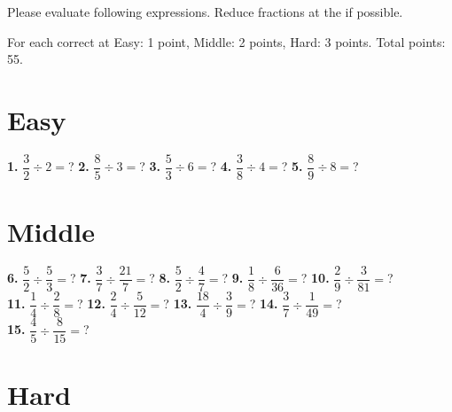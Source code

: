 \documentclass[a4paper]{article}
\begin{document}
\begin{Large}

Please evaluate following expressions. Reduce fractions at the if possible.

For each correct at Easy: 1 point, Middle: 2 points, Hard: 3 points. Total points: 55.

\section* {Easy}
		
\textbf{1.} $\dfrac{3}{2} \div 2 =$? \hspace{0.2cm}
\textbf{2.} $\dfrac{8}{5} \div 3 =$? \hspace{0.2cm}
\textbf{3.} $\dfrac{5}{3} \div 6 =$? \hspace{0.2cm}
\textbf{4.} $\dfrac{3}{8} \div 4 =$? \hspace{0.2cm}
\textbf{5.} $\dfrac{8}{9} \div 8 =$?

		
\section* {Middle}
		
\textbf{6.} $\dfrac{5}{2} \div \dfrac{5}{3} =$? \hspace{0.2cm}
\textbf{7.} $\dfrac{3}{7} \div \dfrac{21}{7} =$? \hspace{0.2cm}
\textbf{8.} $\dfrac{5}{2} \div \dfrac{4}{7} =$? \hspace{0.2cm}
\textbf{9.} $\dfrac{1}{8} \div \dfrac{6}{36} =$? \hspace{0.2cm}
\textbf{10.} $\dfrac{2}{9} \div \dfrac{3}{81} =$? \\[0.75cm]
\textbf{11.} $\dfrac{1}{4} \div \dfrac{2}{8}=$? \hspace{0.2cm}
\textbf{12.} $\dfrac{2}{4} \div \dfrac{5}{12} =$? \hspace{0.2cm}
\textbf{13.} $\dfrac{18}{4} \div \dfrac{3}{9} =$? \hspace{0.2cm}
\textbf{14.} $\dfrac{3}{7} \div \dfrac{1}{49} =$? \\[0.75cm]
\textbf{15.} $\dfrac{4}{5} \div \dfrac{8}{15} =$?
		
\section* {Hard}


\end{Large}
\end{document}
